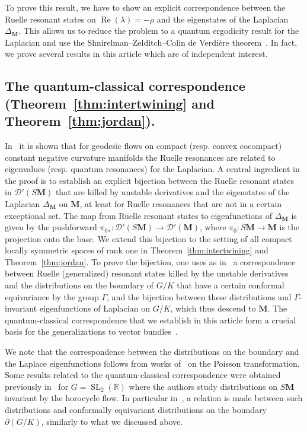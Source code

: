 \documentclass[AHL, Unicode, longabstracts, published]{cedram}
\DeclareMathOperator{\SL}{SL}
\DeclareMathOperator{\Real}{Re}
\newcommand{\mc}{\mathcal}
\newcommand{\rr}{\mathbb{R}}
\newcommand{\bfm}{\mathbf{M}}
\newcommand{\la}{\lambda}
\newcommand{\pl}{\partial}
\begin{document}
To prove this result, we have to show an explicit correspondence between the Ruelle resonant states on ${\Real}(\la)=-\rho$ and the eigenstates of the Laplacian $\Delta_{\bfm}$. This allows us to reduce the problem to a quantum ergodicity result for the Laplacian and use the Shnirelman--Zelditch--Colin de Verdière theorem~\cite{CdV85,Shn74,Zel87}. In fact, we prove several results in this article which are of independent interest.

\subsection{The quantum-classical correspondence (Theorem~\ref{thm:intertwining} and Theorem~\ref{thm:jordan}).}
In~\cite{DFG15,GHW18,Had18} it is shown that for geodesic flows on compact (resp. convex cocompact) constant negative curvature manifolds the Ruelle resonances are related to eigenvalues (resp. quantum resonances) for the Laplacian. A central ingredient in the proof is to establish an explicit bijection between the Ruelle resonant states in $\mathcal D'(S\mathbf M)$ that are killed by unstable derivatives and the eigenstates of the Laplacian $\Delta_{\bfm}$ on $\mathbf M$, at least for Ruelle resonances that are not in a certain exceptional set. The map from Ruelle resonant states to eigenfunctions of $\Delta_{\bfm}$ is given by the pushforward ${\pi_0}_*:\mc{D}'(S\bfm)\to \mc{D}'(\bfm)$, where $\pi_0:S{\bfm}\to {\bfm}$ is the projection onto the base. We extend this bijection to the setting of all compact locally symmetric spaces of rank one in Theorem~\ref{thm:intertwining} and Theorem~\ref{thm:jordan}. To prove the bijection, one uses as in~\cite{DFG15} a correspondence between Ruelle (generalized) resonant states killed by the unstable derivatives and the distributions on the boundary of $G/K$ that have a certain conformal equivariance by the group $\Gamma$, and the bijection between these distributions and $\Gamma$-invariant eigenfunctions of Laplacian on $G/K$, which thus descend to $\bfm$. The quantum-classical correspondence that we establish in this article form a crucial basis for the generalizations to vector bundles~\cite{KW19b,KW19a}.

We note that the correspondence between the distributions on the boundary and the Laplace eigenfunctions follows from works of~\cite{vBS87,GO05,He74,OS80,Ot98} on the Poisson transformation. Some results related to the quantum-classical correspondence were obtained previously in~\cite{Co05,FF03} for $G={\SL}_2(\rr)$ where the authors study distributions on $S\mathbf{M}$ invariant by the horocycle flow. In particular in~\cite{Co05}, a relation is made between such distributions and conformally equivariant distributions on the boundary $\pl(G/K)$, similarly to what we discussed above.
\end{document}
